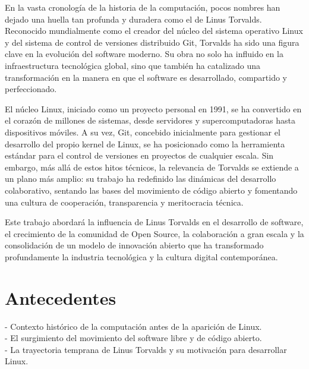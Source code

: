 \documentclass[a4paper,12pt]{article}
\begin{document}
En la vasta cronología de la historia de la computación, pocos nombres han
dejado una huella tan profunda y duradera como el de Linus Torvalds. Reconocido
mundialmente como el creador del núcleo del sistema operativo Linux y del
sistema de control de versiones distribuido Git, Torvalds ha sido una figura
clave en la evolución del software moderno. Su obra no solo ha influido en la
infraestructura tecnológica global, sino que también ha catalizado una
transformación en la manera en que el software es desarrollado, compartido y
perfeccionado.

El núcleo Linux, iniciado como un proyecto personal en 1991, se ha convertido en
el corazón de millones de sistemas, desde servidores y supercomputadoras hasta
dispositivos móviles. A su vez, Git, concebido inicialmente para gestionar el
desarrollo del propio kernel de Linux, se ha posicionado como la herramienta
estándar para el control de versiones en proyectos de cualquier escala. Sin
embargo, más allá de estos hitos técnicos, la relevancia de Torvalds se extiende
a un plano más amplio: su trabajo ha redefinido las dinámicas del desarrollo
colaborativo, sentando las bases del movimiento de código abierto y fomentando
una cultura de cooperación, transparencia y meritocracia técnica.

Este trabajo abordará la influencia de Linus Torvalds en el desarrollo de
software, el crecimiento de la comunidad de Open Source, la colaboración a gran
escala y la consolidación de un modelo de innovación abierto que ha transformado
profundamente la industria tecnológica y la cultura digital contemporánea.  
\newpage

\section{Antecedentes} 
- Contexto histórico de la computación antes de la
aparición de Linux.\\ 




- El surgimiento del movimiento del software libre y de
código abierto.\\ 
- La trayectoria temprana de Linus Torvalds y su motivación
para desarrollar Linux.
\end{document}
